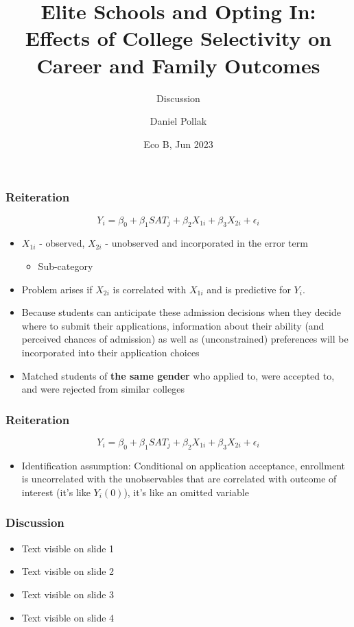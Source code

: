 \documentclass{beamer}
\title[Eco B] %
{Elite Schools and Opting In: Effects of College Selectivity on Career and Family Outcomes}
\subtitle{Discussion}
\author %
{Daniel Pollak}
\institute[VFU] %
{
  Tel-Aviv University
}
\date{Eco B, Jun 2023}
\begin{document}
\frame{\titlepage}

\begin{frame}
\frametitle{Reiteration}
$$Y_i=\beta_0+\beta_1SAT_j+\beta_2X_{1i}+\beta_3X_{2i}+\epsilon_i$$
\begin{itemize}
\item $X_{1i}$ - observed, $X_{2i}$ - unobserved and incorporated in the error term
    \begin{itemize}
    \item Sub-category
    \end{itemize}
\item Problem arises if $X_{2i}$ is correlated with $X_{1i}$ and is predictive for $Y_i$.
\item Because students can anticipate these admission decisions when they decide where to submit their applications, information about their ability (and perceived chances
of admission) as well as (unconstrained) preferences will be incorporated into their application choices
\item Matched students of \textbf{the same gender} who applied to, were accepted to, and were rejected from similar colleges
\end{itemize}
\end{frame}

\begin{frame}
\frametitle{Reiteration}
$$Y_i=\beta_0+\beta_1SAT_j+\beta_2X_{1i}+\beta_3X_{2i}+\epsilon_i$$
\begin{itemize}
\item Identification assumption: Conditional on application acceptance, enrollment is uncorrelated with the unobservables that are correlated with outcome of interest (it’s like $Y_i(0)$), it’s like an omitted variable
\end{itemize}
\end{frame}

\begin{frame}
\frametitle{Discussion}
\begin{itemize}
\item<1-> Text visible on slide 1
\item<1-> Text visible on slide 2
\item<1-> Text visible on slide 3
\item<1-> Text visible on slide 4
\end{itemize}
\end{frame}
\end{document}
